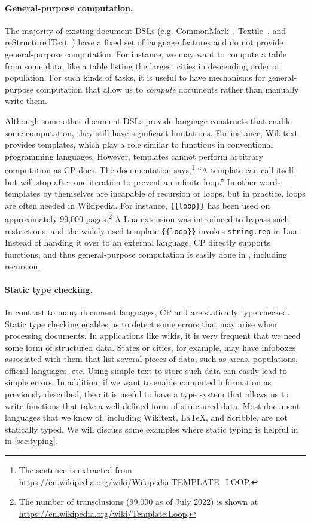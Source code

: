 \paragraph{General-purpose computation.}
The majority of existing document DSLs (e.g. CommonMark~\citep{mark},
Textile~\citep{textile}, and reStructuredText~\citep{rst}) have a fixed set of
language features and do not provide general-purpose computation. For instance,
we may want to compute a table from some data, like a table listing the largest
cities in descending order of population. For such kinds of tasks, it is useful
to have mechanisms for general-purpose computation that allow us to
\emph{compute} documents rather than manually write them.

Although some other document DSLs provide language constructs that enable some
computation, they still have significant limitations. For instance, Wikitext
provides templates, which play a role similar to functions in conventional
programming languages. However, templates cannot perform arbitrary computation
as CP does. The documentation says,\footnote{The sentence is extracted from
\url{https://en.wikipedia.org/wiki/Wikipedia:TEMPLATE_LOOP}.} ``A template can
call itself but will stop after one iteration to prevent an infinite loop.'' In
other words, templates by themselves are incapable of recursion or loops, but in
practice, loops are often needed in Wikipedia. For instance,
\lstinline|{{loop}}| has been used on approximately 99,000 pages.\footnote{The
number of transclusions (99,000 as of July 2022) is shown at
\url{https://en.wikipedia.org/wiki/Template:Loop}.} A Lua extension was
introduced to bypass such restrictions, and the widely-used template
\lstinline|{{loop}}| invokes \lstinline{string.rep} in Lua. Instead of handing
it over to an external language, CP directly supports functions, and thus
general-purpose computation is easily done in \ExT, including recursion. 

\paragraph{Static type checking.}
In contrast to many document languages, CP and \ExT are statically type checked.
Static type checking enables us to detect some errors that may arise when
processing documents. In applications like wikis, it is very frequent that we
need some form of structured data. States or cities, for example, may have
infoboxes associated with them that list several pieces of data, such as areas,
populations, official languages, etc. Using simple text to store such data can
easily lead to simple errors. In addition, if we want to enable computed
information as previously described, then it is useful to have a type system
that allows us to write functions that take a well-defined form of structured
data. Most document languages that we know of, including Wikitext, \LaTeX{}, and
Scribble, are not statically typed. We will discuss some examples where static
typing is helpful in \ExT in \autoref{sec:typing}.

